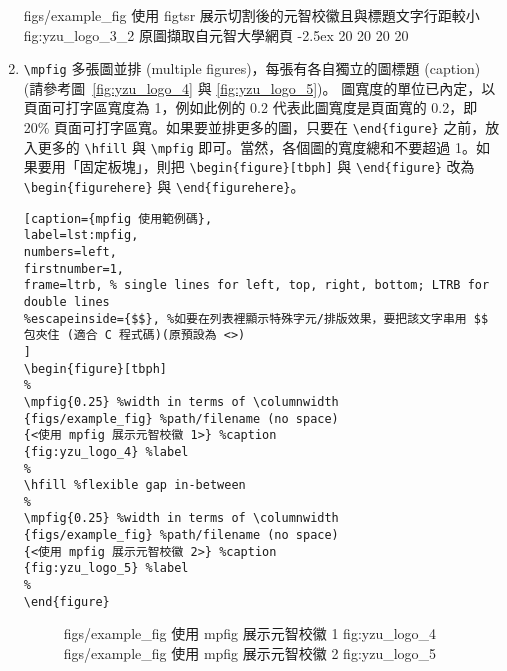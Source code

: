 \begin{enumerate}
%
\figtsr{2cm} %
{figs/example_fig} %
{使用 figtsr 展示切割後的元智校徽且與標題文字行距較小} %
{fig:yzu_logo_3_2} %
{原圖擷取自元智大學網頁} %
{-2.5ex}%
{20 20 20 20} %
%

\item \verb+\mpfig+ 多張圖並排 (multiple figures)，每張有各自獨立的圖標題 (caption) (請參考圖~\ref{fig:yzu_logo_4} 與 \ref{fig:yzu_logo_5})。
圖寬度的單位已內定，以頁面可打字區寬度為 1，例如此例的 0.2 代表此圖寬度是頁面寬的 0.2，即 20\% 頁面可打字區寬。如果要並排更多的圖，只要在 \verb+\end{figure}+ 之前，放入更多的 \verb+\hfill+ 與 \verb+\mpfig+ 即可。當然，各個圖的寬度總和不要超過 1。如果要用「固定板塊」，則把 \verb+\begin{figure}[tbph]+ 與 \verb+\end{figure}+ 改為 \verb+\begin{figurehere}+ 與 \verb+\end{figurehere}+。

{\centering\begin{lstlisting}[caption={mpfig 使用範例碼},
label=lst:mpfig,
numbers=left,
firstnumber=1,
frame=ltrb, % single lines for left, top, right, bottom; LTRB for double lines 
%escapeinside={$$}, %如要在列表裡顯示特殊字元/排版效果，要把該文字串用 $$ 包夾住 (適合 C 程式碼)(原預設為 <>)
]
\begin{figure}[tbph]
%
\mpfig{0.25} %width in terms of \columnwidth
{figs/example_fig} %path/filename (no space)
{<使用 mpfig 展示元智校徽 1>} %caption
{fig:yzu_logo_4} %label
%
\hfill %flexible gap in-between
%
\mpfig{0.25} %width in terms of \columnwidth
{figs/example_fig} %path/filename (no space)
{<使用 mpfig 展示元智校徽 2>} %caption
{fig:yzu_logo_5} %label
%
\end{figure}
\end{lstlisting}\par}


%
\begin{figure}[tbph]
%
{figs/example_fig} %
{使用 mpfig 展示元智校徽 1} %
{fig:yzu_logo_4} %
%
\hfill
%
{figs/example_fig} %
{使用 mpfig 展示元智校徽 2} %
{fig:yzu_logo_5} %
%
\end{figure}



\end{enumerate}
